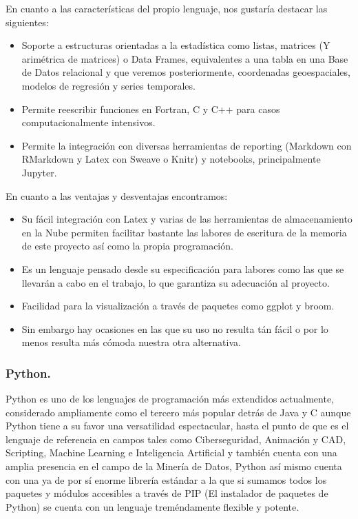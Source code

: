 \documentclass[11pt, a4paper]{article} %
\begin{document}
En cuanto a las características del propio lenguaje, nos gustaría destacar las siguientes:
\begin{itemize}
\item Soporte a estructuras orientadas a la estadística como listas, matrices (Y arimétrica de matrices) o Data Frames, equivalentes a una tabla en una Base de Datos relacional y que veremos posteriormente, coordenadas geoespaciales, modelos de regresión y series temporales.
\item Permite reescribir funciones en Fortran, C y C++ para casos computacionalmente intensivos.
\item Permite la integración con diversas herramientas de reporting (Markdown con RMarkdown y Latex con Sweave o Knitr) y notebooks, principalmente Jupyter.
\end{itemize}
En cuanto a las ventajas y desventajas encontramos:
\begin{itemize}
\item Su fácil integración con Latex y varias de las herramientas de almacenamiento en la Nube permiten facilitar bastante las labores de escritura de la memoria de este proyecto así como la propia programación.
\item Es un lenguaje pensado desde su especificación para labores como las que se llevarán a cabo en el trabajo, lo que garantiza su adecuación al proyecto.
\item Facilidad para la visualización a través de paquetes como ggplot y broom.
\item Sin embargo hay ocasiones en las que su uso no resulta tán fácil o por lo menos resulta más cómoda nuestra otra alternativa.
\end{itemize}
\subsubsection{Python.}
Python es uno de los lenguajes de programación más extendidos actualmente, considerado ampliamente como el tercero más popular detrás de Java y C aunque Python tiene a su favor una versatilidad espectacular, hasta el punto de que es el lenguaje de referencia en campos tales como Ciberseguridad, Animación y CAD, Scripting, Machine Learning e Inteligencia Artificial y también cuenta con una amplia presencia en el campo de la Minería de Datos, Python así mismo cuenta con una ya de por sí enorme librería estándar a la que si sumamos todos los paquetes y módulos accesibles a través de PIP (El instalador de paquetes de Python) se cuenta con un lenguaje treméndamente flexible y potente. \cite{python}
\end{document}

